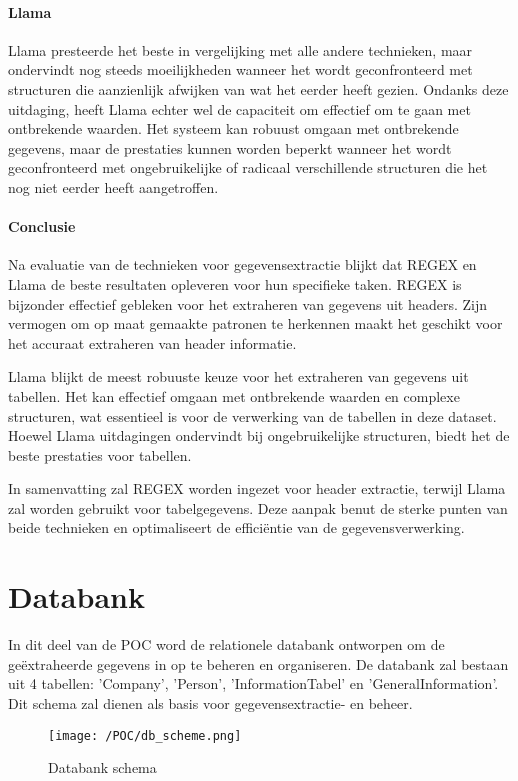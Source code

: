 \paragraph{Llama}
Llama presteerde het beste in vergelijking met alle andere technieken, maar ondervindt nog steeds moeilijkheden wanneer het wordt geconfronteerd met structuren die aanzienlijk afwijken van wat het eerder heeft gezien. Ondanks deze uitdaging, heeft Llama echter wel de capaciteit om effectief om te gaan met ontbrekende waarden. Het systeem kan robuust omgaan met ontbrekende gegevens, maar de prestaties kunnen worden beperkt wanneer het wordt geconfronteerd met ongebruikelijke of radicaal verschillende structuren die het nog niet eerder heeft aangetroffen.

\paragraph{Conclusie}


Na evaluatie van de technieken voor gegevensextractie blijkt dat REGEX en Llama de beste resultaten opleveren voor hun specifieke taken. REGEX is bijzonder effectief gebleken voor het extraheren van gegevens uit headers. Zijn vermogen om op maat gemaakte patronen te herkennen maakt het geschikt voor het accuraat extraheren van header informatie. 

Llama blijkt de meest robuuste keuze voor het extraheren van gegevens uit tabellen. Het kan effectief omgaan met ontbrekende waarden en complexe structuren, wat essentieel is voor de verwerking van de tabellen in deze dataset. Hoewel Llama uitdagingen ondervindt bij ongebruikelijke structuren, biedt het de beste prestaties voor tabellen.

In samenvatting zal REGEX worden ingezet voor header extractie, terwijl Llama zal worden gebruikt voor tabelgegevens. Deze aanpak benut de sterke punten van beide technieken en optimaliseert de efficiëntie van de gegevensverwerking.

\section{Databank}
In dit deel van de POC word de relationele databank ontworpen om de geëxtraheerde gegevens in op te beheren en organiseren. De databank zal bestaan uit 4 tabellen: 'Company', 'Person', 'InformationTabel' en 'GeneralInformation'. Dit schema zal dienen als basis voor gegevensextractie- en beheer.

\begin{figure}[H]
    \centering        
    \texttt{[image: /POC/db\_scheme.png]}
    \caption{Databank schema}
    \label{fig:databank_schema}
\end{figure}
